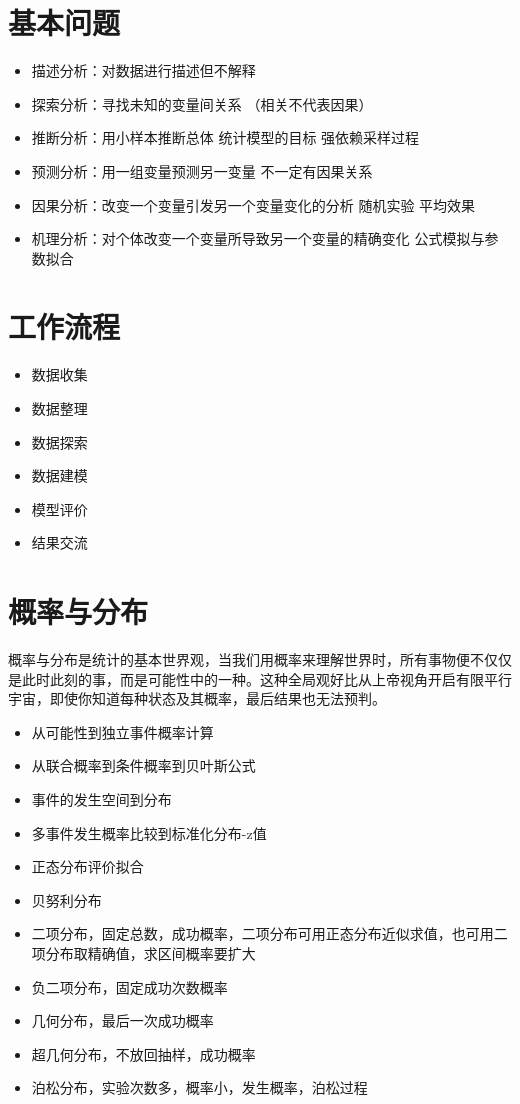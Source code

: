 \documentclass[]{book}
\providecommand{\tightlist}{%
  \setlength{\itemsep}{0pt}\setlength{\parskip}{0pt}}
\begin{document}
\section{基本问题}

\begin{itemize}
\tightlist
\item
  描述分析：对数据进行描述但不解释
\item
  探索分析：寻找未知的变量间关系 （相关不代表因果）
\item
  推断分析：用小样本推断总体 统计模型的目标 强依赖采样过程
\item
  预测分析：用一组变量预测另一变量 不一定有因果关系
\item
  因果分析：改变一个变量引发另一个变量变化的分析 随机实验 平均效果
\item
  机理分析：对个体改变一个变量所导致另一个变量的精确变化 公式模拟与参数拟合
\end{itemize}

\section{工作流程}

\begin{itemize}
\tightlist
\item
  数据收集
\item
  数据整理
\item
  数据探索
\item
  数据建模
\item
  模型评价
\item
  结果交流
\end{itemize}

\section{概率与分布}

概率与分布是统计的基本世界观，当我们用概率来理解世界时，所有事物便不仅仅是此时此刻的事，而是可能性中的一种。这种全局观好比从上帝视角开启有限平行宇宙，即使你知道每种状态及其概率，最后结果也无法预判。

\begin{itemize}
\tightlist
\item
  从可能性到独立事件概率计算
\item
  从联合概率到条件概率到贝叶斯公式
\item
  事件的发生空间到分布
\item
  多事件发生概率比较到标准化分布-z值
\item
  正态分布评价拟合
\item
  贝努利分布
\item
  二项分布，固定总数，成功概率，二项分布可用正态分布近似求值，也可用二项分布取精确值，求区间概率要扩大
\item
  负二项分布，固定成功次数概率
\item
  几何分布，最后一次成功概率
\item
  超几何分布，不放回抽样，成功概率
\item
  泊松分布，实验次数多，概率小，发生概率，泊松过程
\end{itemize}
\end{document}
